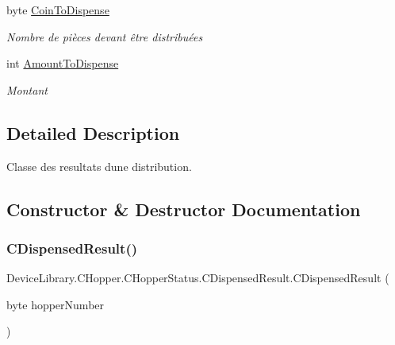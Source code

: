 \begin{DoxyCompactItemize}
byte \mbox{\hyperlink{class_device_library_1_1_c_hopper_1_1_c_hopper_status_1_1_c_dispensed_result_a6aae05e36efc56b7879b36cae19836fd}{Coin\+To\+Dispense}}
\begin{DoxyCompactList}\small\item\em Nombre de pièces devant être distribuées \end{DoxyCompactList}\item 
int \mbox{\hyperlink{class_device_library_1_1_c_hopper_1_1_c_hopper_status_1_1_c_dispensed_result_a50cf9d9c803868a3d5df1a5359c4efd4}{Amount\+To\+Dispense}}
\begin{DoxyCompactList}\small\item\em Montant \end{DoxyCompactList}\end{DoxyCompactItemize}


\subsection{Detailed Description}
Classe des resultats d\textquotesingle{}une distribution. 



\subsection{Constructor \& Destructor Documentation}
\mbox{\label{class_device_library_1_1_c_hopper_1_1_c_hopper_status_1_1_c_dispensed_result_afe0fb651efeaf2009052a6f45f64dbbe}} 
\subsubsection{\texorpdfstring{C\+Dispensed\+Result()}{CDispensedResult()}}
{\footnotesize\ttfamily Device\+Library.\+C\+Hopper.\+C\+Hopper\+Status.\+C\+Dispensed\+Result.\+C\+Dispensed\+Result (\begin{DoxyParamCaption}\item[{byte}]{hopper\+Number }\end{DoxyParamCaption})\hspace{0.3cm}{\ttfamily [inline]}}



